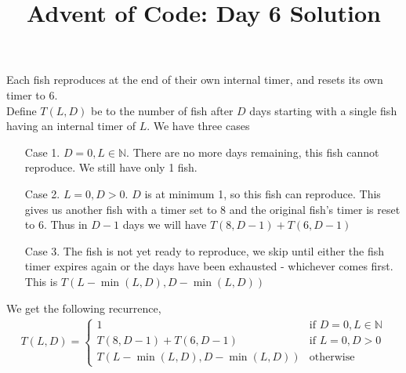 \documentclass{article}
\title{Advent of Code: Day 6 Solution}
\date{}
\begin{document}
    \maketitle
    \noindent Each fish reproduces at the end of their own internal timer, and resets
    its own timer to 6.\\
    
    \noindent Define \(T(L,D)\) be to the number of fish after \(D\) days
    starting with a single fish having an internal timer of \(L\). We have three
    cases
    \begin{enumerate}
        \item [Case 1.] \(D = 0, L \in \mathbb{N}\). There are no more days remaining,
        this fish cannot reproduce. We still have only 1 fish.
        \item [Case 2.] \(L = 0, D > 0\). \(D\) is at minimum 1, so this fish can reproduce.
        This gives us another fish with a timer set to 8 and the original fish's timer is 
        reset to 6. Thus in \(D - 1\) days we will have \(T(8, D-1) + T(6, D - 1)\)
        \item [Case 3.] The fish is not yet ready to reproduce, we skip until
        either the fish timer expires again or the days have been exhausted -
        whichever comes first. This is \(T(L - \min(L,D), D - \min(L,D))\)
    \end{enumerate}
    We get the following recurrence,
    \begin{eqnarray}
        T(L,D) = \begin{cases}
            1 & \textrm{if } D = 0, L \in \mathbb{N}\\
            T(8, D - 1) + T(6, D - 1) & \textrm{if } L = 0, D > 0\\
            T(L - \min(L,D), D - \min(L,D)) & \textrm{otherwise}
        \end{cases}
    \end{eqnarray}
\end{document}
